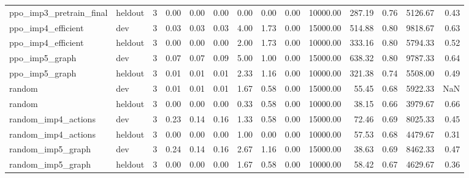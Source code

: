 \begin{tabular}{llrrrrrrrrrrrr}
ppo_imp3_pretrain_final & heldout & 3 & 0.00 & 0.00 & 0.00 & 0.00 & 0.00 & 0.00 & 10000.00 & 287.19 & 0.76 & 5126.67 & 0.43 \\
ppo_imp4_efficient & dev & 3 & 0.03 & 0.03 & 0.03 & 4.00 & 1.73 & 0.00 & 15000.00 & 514.88 & 0.80 & 9818.67 & 0.63 \\
ppo_imp4_efficient & heldout & 3 & 0.00 & 0.00 & 0.00 & 2.00 & 1.73 & 0.00 & 10000.00 & 333.16 & 0.80 & 5794.33 & 0.52 \\
ppo_imp5_graph & dev & 3 & 0.07 & 0.07 & 0.09 & 5.00 & 1.00 & 0.00 & 15000.00 & 638.32 & 0.80 & 9787.33 & 0.64 \\
ppo_imp5_graph & heldout & 3 & 0.01 & 0.01 & 0.01 & 2.33 & 1.16 & 0.00 & 10000.00 & 321.38 & 0.74 & 5508.00 & 0.49 \\
random & dev & 3 & 0.01 & 0.01 & 0.01 & 1.67 & 0.58 & 0.00 & 15000.00 & 55.45 & 0.68 & 5922.33 & NaN \\
random & heldout & 3 & 0.00 & 0.00 & 0.00 & 0.33 & 0.58 & 0.00 & 10000.00 & 38.15 & 0.66 & 3979.67 & 0.66 \\
random_imp4_actions & dev & 3 & 0.23 & 0.14 & 0.16 & 1.33 & 0.58 & 0.00 & 15000.00 & 72.46 & 0.69 & 8025.33 & 0.45 \\
random_imp4_actions & heldout & 3 & 0.00 & 0.00 & 0.00 & 1.00 & 0.00 & 0.00 & 10000.00 & 57.53 & 0.68 & 4479.67 & 0.31 \\
random_imp5_graph & dev & 3 & 0.24 & 0.14 & 0.16 & 2.67 & 1.16 & 0.00 & 15000.00 & 38.63 & 0.69 & 8462.33 & 0.47 \\
random_imp5_graph & heldout & 3 & 0.00 & 0.00 & 0.00 & 1.67 & 0.58 & 0.00 & 10000.00 & 58.42 & 0.67 & 4629.67 & 0.36 \\
\bottomrule
\end{tabular}
